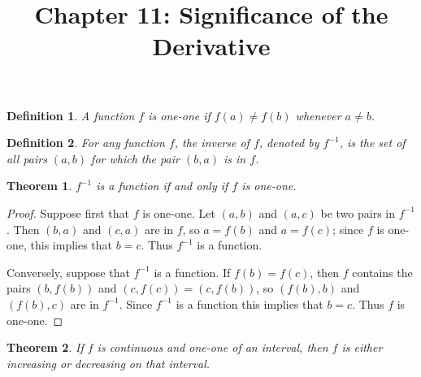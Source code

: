 \documentclass{article}
\newtheorem{definition}{Definition}
\newtheorem{theorem}{Theorem}
\begin{document}
\title{Chapter 11: Significance of the Derivative}
\maketitle

\begin{definition}
  A function $f$ is \emph{one-one} if $f(a) \neq f(b)$ whenever $a \neq b$.
\end{definition}

\begin{definition}
  For any function $f$, the \emph{inverse} of $f$, denoted by $f^{-1}$, is the
  set of all pairs $(a, b)$ for which the pair $(b, a)$ is in $f$.
\end{definition}

\begin{theorem}
  $f^{-1}$ is a function if and only if $f$ is one-one.
\end{theorem}

\begin{proof}
  Suppose first that $f$ is one-one. Let $(a, b)$ and $(a, c)$ be two pairs in
  $f^{-1}$. Then $(b, a)$ and $(c, a)$ are in $f$, so $a = f(b)$ and $a =
  f(c)$; since $f$ is one-one, this implies that $b = c$. Thus $f^{-1}$ is a
  function.

  Conversely, suppose that $f^{-1}$ is a function. If $f(b) = f(c)$, then $f$
  contains the pairs $(b, f(b))$ and $(c, f(c)) = (c, f(b))$, so $(f(b), b)$
  and $(f(b), c)$ are in $f^{-1}$. Since $f^{-1}$ is a function this implies
  that $b = c$. Thus $f$ is one-one.
\end{proof}

\begin{theorem}
  If $f$ is continuous and one-one of an interval, then $f$ is either
  increasing or decreasing on that interval.
\end{theorem}
\end{document}
